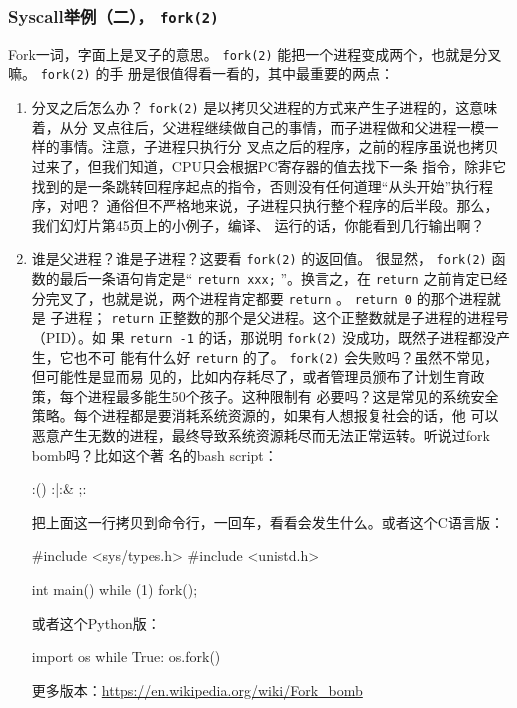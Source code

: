 \documentclass{wx672ctexart}
\newcommand\mpic[1]{%
  \marginpar{\texttt{[image: thumbnails/\#1]}}}
\begin{document}
\subsubsection{Syscall举例（二）， \texttt{fork(2)}}
\label{sec:org9fd0921}
Fork一词，字面上是叉子的意思。 \texttt{fork(2)} 能把一个进程变成两个，也就是分叉嘛。 \texttt{fork(2)} 的手
册是很值得看一看的，其中最重要的两点：\mpic{pg_0045}
\begin{enumerate}
\item 分叉之后怎么办？ \texttt{fork(2)} 是以拷贝父进程的方式来产生子进程的，这意味着，从分
  叉点往后，父进程继续做自己的事情，而子进程做和父进程一模一样的事情。注意，子进程只执行分
  叉点之后的程序，之前的程序虽说也拷贝过来了，但我们知道，CPU只会根据PC寄存器的值去找下一条
  指令，除非它找到的是一条跳转回程序起点的指令，否则没有任何道理“从头开始”执行程序，对吧？
  通俗但不严格地来说，子进程只执行整个程序的后半段。那么，我们幻灯片第45页上的小例子，编译、
  运行的话，你能看到几行输出啊？
\item 谁是父进程？谁是子进程？这要看 \texttt{fork(2)} 的返回值。 很显然， \texttt{fork(2)}
  函数的最后一条语句肯定是“ \texttt{return xxx;} ”。换言之，在 \texttt{return} 之前肯定已经
  分完叉了，也就是说，两个进程肯定都要 \texttt{return} 。 \texttt{return 0} 的那个进程就是
  子进程； \texttt{return} 正整数的那个是父进程。这个正整数就是子进程的进程号（PID）。如
  果 \texttt{return -1} 的话，那说明 \texttt{fork(2)} 没成功，既然子进程都没产生，它也不可
  能有什么好 \texttt{return} 的了。 \texttt{fork(2)} 会失败吗？虽然不常见，但可能性是显而易
  见的，比如内存耗尽了，或者管理员颁布了计划生育政策，每个进程最多能生50个孩子。这种限制有
  必要吗？这是常见的系统安全策略。每个进程都是要消耗系统资源的，如果有人想报复社会的话，他
  可以恶意产生无数的进程，最终导致系统资源耗尽而无法正常运转。听说过fork bomb吗？比如这个著
  名的bash script：
\begin{shellcode}
:(){ :|:& };:
\end{shellcode}
  把上面这一行拷贝到命令行，一回车，看看会发生什么。或者这个C语言版：
\begin{ccode}
#include <sys/types.h>
#include <unistd.h>

int main() { while (1) fork(); }
\end{ccode}

  或者这个Python版：
\begin{pythoncode}
import os
while True:
    os.fork()
\end{pythoncode}
  更多版本：\url{https://en.wikipedia.org/wiki/Fork\_bomb}
\end{enumerate}
\end{document}
